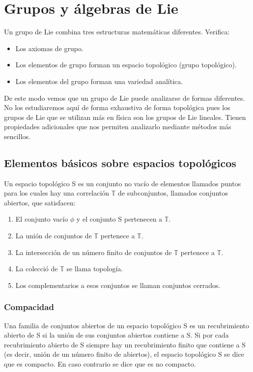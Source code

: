 
\section{ Grupos y álgebras de Lie}

Un grupo de Lie combina tres estructuras matemáticas diferentes. Verifica:

\begin{itemize}
\item Los axiomas de grupo.
\item Los elementos de grupo forman un espacio topológico (grupo topológico).
\item Los elementos del grupo forman una variedad analítica.
\end{itemize}

De este modo vemos que un grupo de Lie puede analizarse de formas diferentes. No los estudiaremos aquí de forma exhaustiva de forma topológica pues los grupos de Lie que se utilizan más en física son los grupos de Lie lineales. Tienen propiedades adicionales que nos permiten analizarlo mediante métodos más sencillos.

\subsection{Elementos básicos sobre espacios topológicos}

Un espacio topológico S es un conjunto no vacío de elementos llamados puntos para los cuales hay una correlación $\mathds{T}$ de subconjuntos, llamados conjuntos abiertos, que satisfacen:

\begin{enumerate}
\item El conjunto vacío $\phi$ y el conjunto S pertenecen a $\mathds{T}$.
\item La unión de conjuntos de $\mathds{T}$ pertenece a $\mathds{T}$.
\item La intersección de un número finito de conjuntos de $\mathds{T}$ pertenece a $\mathds{T}$.
\item La colecció de $\mathds{T}$ se llama topología.
\item Los complementarios a esos conjuntos se llaman conjuntos cerrados.
\end{enumerate}

\subsubsection{Compacidad}

Una familia de conjuntos abiertos de un espacio topológico S es un recubrimiento abierto de S si la unión de sus conjuntos abiertos contiene a S. Si por cada recubrimiento abierto de S siempre hay un recubrimiento finito que contiene a S (es decir, unión de un número finito de abiertos), el espacio topológico S se dice que es compacto. En caso contrario se dice que es no compacto.

